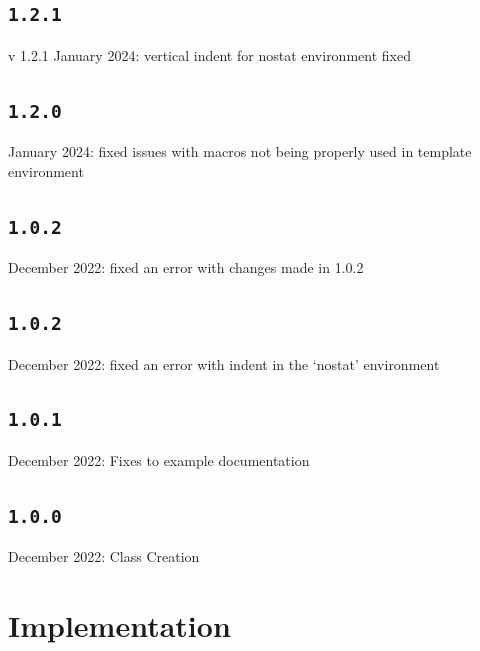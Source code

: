 \documentclass{article}
\begin{document}
\subsection{\normalfont\texttt{1.2.1}} v 1.2.1  January 2024: vertical indent for nostat environment fixed

\subsection{\normalfont\texttt{1.2.0}}  January 2024:  fixed issues with macros not being properly used in template environment

				\subsection{\normalfont\texttt{1.0.2}}
 December 2022: fixed an error with changes made in 1.0.2
\subsection{\normalfont\texttt{1.0.2}}
 December 2022: fixed an error with indent in the `nostat' environment
\subsection{\normalfont\texttt{1.0.1}}
 December 2022: Fixes to example documentation

\subsection{\normalfont\texttt{1.0.0}}
 December 2022: Class Creation


	\clearpage\section{Implementation}
	
\end{document}
